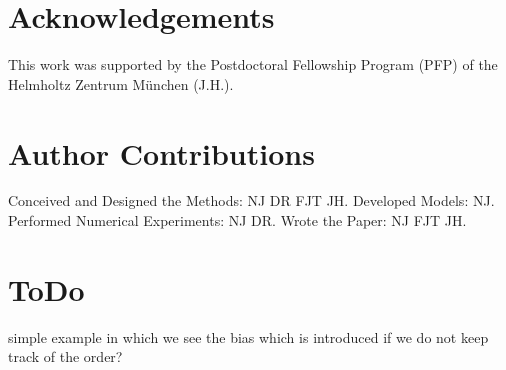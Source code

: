 \documentclass[10pt,letterpaper]{article}
\newcommand{\jh}[1]{{\color{red}#1}}
\begin{document}
\section*{Acknowledgements}


This work was supported by the Postdoctoral Fellowship Program (PFP) of the Helmholtz Zentrum M\"unchen (J.H.).

\section*{Author Contributions}

Conceived and Designed the Methods: NJ DR FJT JH.
Developed Models: NJ.
Performed Numerical Experiments: NJ DR.
Wrote the Paper: NJ FJT JH.

\nolinenumbers





\section{ToDo}

\jh{simple example in which we see the bias which is introduced if we do not keep track of the order?}
\end{document}

